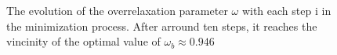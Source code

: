 \documentclass[12pt, graphicx]{article}
\begin{document}
\begin{figure}[ht]
\caption{The evolution of the overrelaxation parameter $\omega$ with each step $\mathrm{i}$ in the minimization process. After arround ten steps, it reaches the vincinity of the optimal value of $\omega_b\approx0.946$}
\label{fig:golden}
\end{figure}
\end{document}
